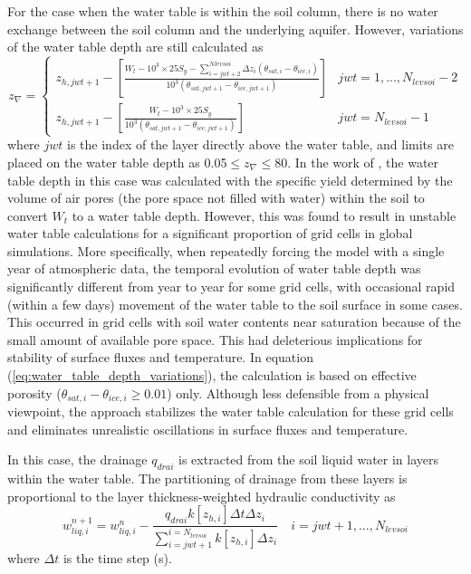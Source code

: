 \documentclass[12pt,authoryear]{elsarticle}
\numberwithin{equation}{section} %
\begin{document}
For the case when the water table is within the soil column, there is no water exchange between the soil column and the underlying aquifer. However, variations of the water table depth are still calculated as
\begin{equation}
\label{eq:water_table_depth_variations}
z_{\nabla}=
\begin{cases}
z_{h,jwt+1}-\left[\frac{W_{t}-10^3\times 25S_{y}-\sum\limits_{i=jwt+2}^{N_{}levsoi}\Delta z_{i}(\theta_{sat,i}-\theta_{ice,i})}{10^3(\theta_{sat,jwt+1}-\theta_{ice,jwt+1})}\right] & jwt=1,...,N_{levsoi}-2 \\
z_{h,jwt+1}-\left[\frac{W_{t}-10^3\times 25S_{y}}{10^3(\theta_{sat,jwt+1}-\theta_{ice,jwt+1})}\right] & jwt=N_{levsoi}-1
\end{cases}
\end{equation}
where $jwt$ is the index of the layer directly above the water table, and limits are placed
on the water table depth as 0.05$\leq z_{\nabla} \leq$80. In the work of \cite{niuDevelopmentSimpleGroundwater2007}, the water table depth in this case was calculated with the specific yield determined by the volume of air pores (the pore space not filled with water) within the soil to convert $W_{t}$ to a water table depth. However, this was found to result in unstable water table calculations for a significant proportion of grid cells in global simulations. More specifically, when repeatedly forcing the model with a single year of atmospheric data, the temporal evolution of water table depth was significantly different from year to year for some grid cells, with occasional rapid (within a few days) movement of the water table to the soil surface in some cases. This occurred in grid cells with soil water contents near saturation because of the small amount of available pore space. This had deleterious implications for stability of surface fluxes and temperature. In equation (\ref{eq:water_table_depth_variations}), the calculation is based on effective porosity ($\theta_{sat,i}-\theta_{ice,i}\geq0.01$) only. Although less defensible from a physical viewpoint, the approach stabilizes the water table calculation for these grid cells and eliminates unrealistic oscillations in surface fluxes and temperature.

In this case, the drainage $q_{drai}$ is extracted from the soil liquid water in layers within
the water table. The partitioning of drainage from these layers is proportional to the layer
thickness-weighted hydraulic conductivity as
\begin{equation}
w_{liq,i}^{n+1} = w_{liq,i}^{n}-\frac{q_{drai}k[z_{h,i}]\Delta t \Delta z_{i}}{\sum\limits_{i=jwt+1}^{i=N_{levsoi}}k[z_{h,i}]\Delta z_{i}} \quad i=jwt+1,...,N_{levsoi}
\end{equation}
where $\Delta t$ is the time step (s).
\end{document}
